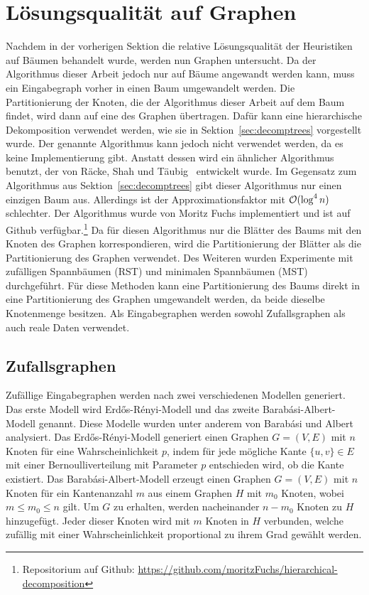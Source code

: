 \pagebreak

\section{Lösungsqualität auf Graphen}
Nachdem in der vorherigen Sektion die relative Lösungsqualität der Heuristiken auf Bäumen behandelt wurde, werden nun Graphen untersucht.
Da der Algorithmus dieser Arbeit jedoch nur auf Bäume angewandt werden kann, muss ein Eingabegraph vorher in einen Baum umgewandelt werden.
Die Partitionierung der Knoten, die der Algorithmus dieser Arbeit auf dem Baum findet, wird dann auf eine des Graphen übertragen.
Dafür kann eine hierarchische Dekomposition verwendet werden, wie sie in Sektion~\ref{sec:decomptrees} vorgestellt wurde.
Der genannte Algorithmus kann jedoch nicht verwendet werden, da es keine Implementierung gibt.
Anstatt dessen wird ein ähnlicher Algorithmus benutzt, der von Räcke, Shah und Täubig~\cite{RST14} entwickelt wurde.
Im Gegensatz zum Algorithmus aus Sektion~\ref{sec:decomptrees} gibt dieser Algorithmus nur einen einzigen Baum aus.
Allerdings ist der Approximationsfaktor mit $\mathcal{O}(\log^4 n)$ schlechter.
Der Algorithmus wurde von Moritz Fuchs implementiert und ist auf Github verfügbar.\footnote{Repositorium auf Github: \url{https://github.com/moritzFuchs/hierarchical-decomposition}}
Da für diesen Algorithmus nur die Blätter des Baums mit den Knoten des Graphen korrespondieren, wird die Partitionierung der Blätter als die Partitionierung des Graphen verwendet.
Des Weiteren wurden Experimente mit zufälligen Spannbäumen (RST) und minimalen Spannbäumen (MST) durchgeführt.
Für diese Methoden kann eine Partitionierung des Baums direkt in eine Partitionierung des Graphen umgewandelt werden, da beide dieselbe Knotenmenge besitzen.
Als Eingabegraphen werden sowohl Zufallsgraphen als auch reale Daten verwendet.

\subsection{Zufallsgraphen}
Zufällige Eingabegraphen werden nach zwei verschiedenen Modellen generiert.
Das erste Modell wird Erdős-Rényi-Modell und das zweite Barabási-Albert-Modell genannt.
Diese Modelle wurden unter anderem von Barabási und Albert~\cite{AB02} analysiert.
Das Erdős-Rényi-Modell generiert einen Graphen $G=(V,E)$ mit $n$ Knoten für eine Wahrscheinlichkeit $p$, indem für jede mögliche Kante $\{u, v\} \in E$ mit einer Bernoulliverteilung mit Parameter $p$ entschieden wird, ob die Kante existiert.
Das Barabási-Albert-Modell erzeugt einen Graphen $G=(V,E)$ mit $n$ Knoten für ein Kantenanzahl $m$ aus einem Graphen $H$ mit $m_0$ Knoten, wobei $m \leq m_0 \leq n$ gilt.
Um $G$ zu erhalten, werden nacheinander $n - m_0$ Knoten zu $H$ hinzugefügt.
Jeder dieser Knoten wird mit $m$ Knoten in $H$ verbunden, welche zufällig mit einer Wahrscheinlichkeit proportional zu ihrem Grad gewählt werden.

